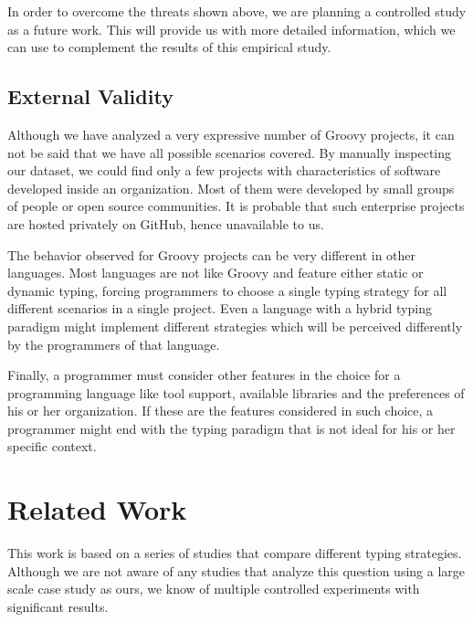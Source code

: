 \documentclass[preprint]{sigplanconf}
\begin{document}
In order to overcome the threats shown above, we are planning a controlled study as a future work.
This will provide us with more detailed information, which we can use to complement the results of this empirical study.

\subsection*{External Validity}
Although we have analyzed a very expressive number of Groovy projects, it can not be said that we have all possible scenarios covered.
By manually inspecting our dataset, we could find only a few projects with characteristics of software developed inside an organization.
Most of them were developed by small groups of people or open source communities.
It is probable that such enterprise projects are hosted privately on GitHub, hence unavailable to us.

The behavior observed for Groovy projects can be very different in other languages.
Most languages are not like Groovy and feature either static or dynamic typing, forcing programmers to choose a single typing strategy for all different scenarios in a single project.
Even a language with a hybrid typing paradigm might implement different strategies which will be perceived differently by the programmers of that language.

Finally, a programmer must consider other features in the choice for a programming language like tool support, available libraries and the preferences of his or her organization.
If these are the features considered in such choice, a programmer might end with the typing paradigm that is not ideal for his or her specific context.











%
%
\section{Related Work\label{sec:Trabalhos-Relacionados}}
This work is based on a series of studies that compare different typing strategies.
Although we are not aware of any studies that analyze this question using a large scale case study as ours, we know of multiple controlled experiments with significant results.
\end{document}
